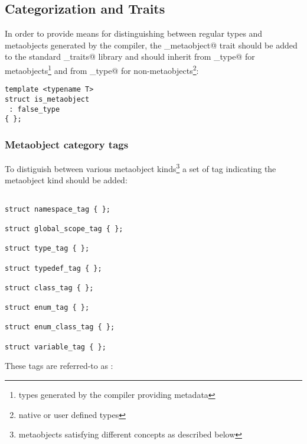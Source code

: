 \subsection{Categorization and Traits}

In order to provide means for distinguishing between regular types
and metaobjects generated by the compiler,
the \verb@is_metaobject@ trait should be added to the standard \verb@type_traits@ library
and should inherit from \verb@true_type@ for metaobjects\footnote{types generated
by the compiler providing metadata} and from \verb@false_type@
for non-metaobjects\footnote{native or user defined types}:

\begin{verbatim}
template <typename T>
struct is_metaobject
 : false_type
{ };
\end{verbatim}

\subsubsection{Metaobject category tags}
\label{metaobject-category-tags}

To distiguish between various metaobject kinds\footnote{metaobjects satisfying different concepts
as described below} a set of tag \verb@struct@s indicating the metaobject kind
should be added:

\begin{verbatim}

struct namespace_tag { };

struct global_scope_tag { };

struct type_tag { };

struct typedef_tag { }; 

struct class_tag { };

struct enum_tag { };

struct enum_class_tag { };

struct variable_tag { };

\end{verbatim}

These tags are referred-to as \verb@MetaobjectCategory@:

